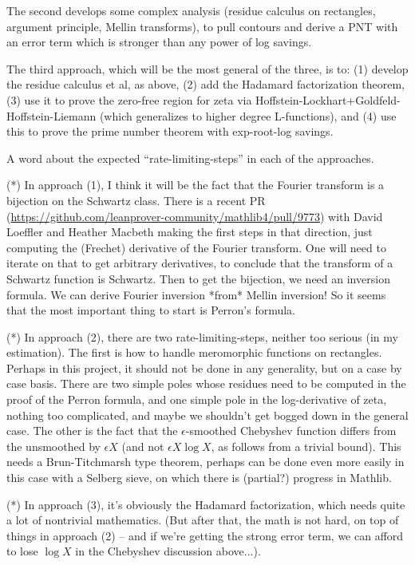 The second develops some complex analysis (residue calculus on rectangles, argument principle, Mellin transforms), to pull contours and derive a PNT with an error term which is stronger than any power of log savings.

The third approach, which will be the most general of the three, is to: (1) develop the residue calculus et al, as above, (2) add the Hadamard factorization theorem, (3) use it to prove the zero-free region for zeta via Hoffstein-Lockhart+Goldfeld-Hoffstein-Liemann (which generalizes to higher degree L-functions), and (4) use this to prove the prime number theorem with exp-root-log savings.

A word about the expected ``rate-limiting-steps'' in each of the approaches.

(*) In approach (1), I think it will be the fact that the Fourier transform is a bijection on the Schwartz class. There is a recent PR (\url{https://github.com/leanprover-community/mathlib4/pull/9773}) with David Loeffler and Heather Macbeth making the first steps in that direction, just computing the (Frechet) derivative of the Fourier transform. One will need to iterate on that to get arbitrary derivatives, to conclude that the transform of a Schwartz function is Schwartz. Then to get the bijection, we need an inversion formula. We can derive Fourier inversion *from* Mellin inversion! So it seems that the most important thing to start is Perron's formula.

(*) In approach (2), there are two rate-limiting-steps, neither too serious (in my estimation). The first is how to handle meromorphic functions on rectangles. Perhaps in this project, it should not be done in any generality, but on a case by case basis. There are two simple poles whose residues need to be computed in the proof of the Perron formula, and one simple pole in the log-derivative of zeta, nothing too complicated, and maybe we shouldn't get bogged down in the general case. The other is the fact that the $\epsilon$-smoothed Chebyshev function differs from the unsmoothed by $\epsilon X$ (and not $\epsilon X \log X$, as follows from a trivial bound). This needs a Brun-Titchmarsh type theorem, perhaps can be done even more easily in this case with a Selberg sieve, on which there is (partial?) progress in Mathlib.

(*) In approach (3), it's obviously the Hadamard factorization, which needs quite a lot of nontrivial mathematics. (But after that, the math is not hard, on top of things in approach (2) -- and if we're getting the strong error term, we can afford to lose $\log X$ in the Chebyshev discussion above...).

